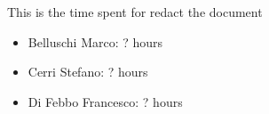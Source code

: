 This is the time spent for redact the document
\begin{itemize}
	\item Belluschi Marco: ? hours
	\item Cerri Stefano: ? hours
	\item Di Febbo Francesco: ? hours
\end{itemize}
